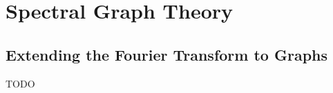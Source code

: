 \section{Spectral Graph Theory}%
\label{sec:sgt}

\subsection{Extending the Fourier Transform to Graphs}%
\label{sec:sgt:spec}

TODO
